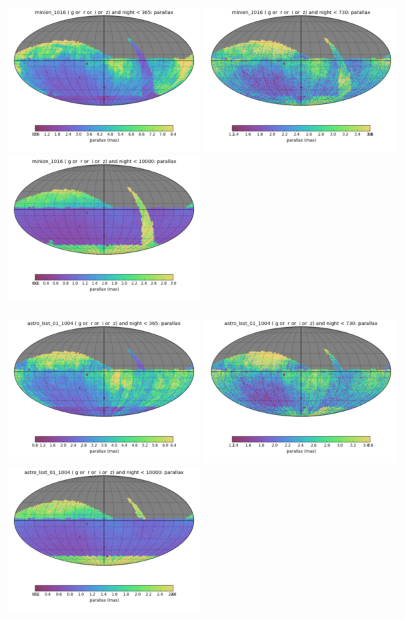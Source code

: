 \begin{figure}[ht]
  \begin{center}
  \includegraphics[width=2.0in]{./figs/milkyway/astromPanels/MW_Astrom_paError_Baseline_01y_map.png}
  \includegraphics[width=2.0in]{./figs/milkyway/astromPanels/MW_Astrom_paError_Baseline_02y_map.png}
  \includegraphics[width=2.0in]{./figs/milkyway/astromPanels/MW_Astrom_paError_Baseline_10y_map.png}
  \end{center}
  \begin{center}
  \includegraphics[width=2.0in]{./figs/milkyway/astromPanels/MW_Astrom_paError_wfdPlane_01y_map.png}
  \includegraphics[width=2.0in]{./figs/milkyway/astromPanels/MW_Astrom_paError_wfdPlane_02y_map.png}
  \includegraphics[width=2.0in]{./figs/milkyway/astromPanels/MW_Astrom_paError_wfdPlane_10y_map.png}
  \end{center}


\end{figure}
